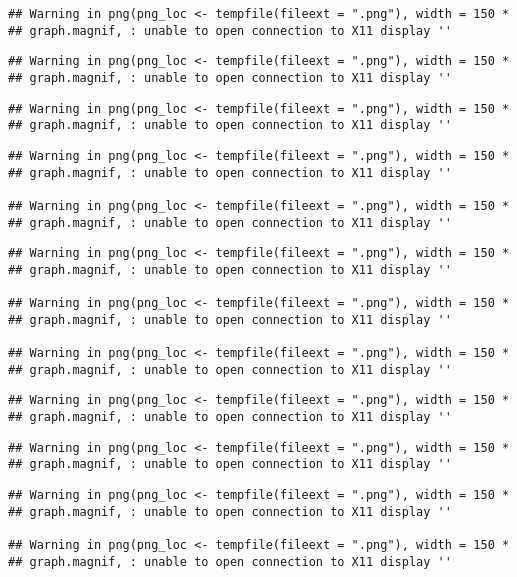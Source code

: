 \documentclass[]{article}
\begin{document}
\begin{verbatim}
## Warning in png(png_loc <- tempfile(fileext = ".png"), width = 150 *
## graph.magnif, : unable to open connection to X11 display ''
\end{verbatim}

\begin{verbatim}
## Warning in png(png_loc <- tempfile(fileext = ".png"), width = 150 *
## graph.magnif, : unable to open connection to X11 display ''
\end{verbatim}

\begin{verbatim}
## Warning in png(png_loc <- tempfile(fileext = ".png"), width = 150 *
## graph.magnif, : unable to open connection to X11 display ''
\end{verbatim}

\begin{verbatim}
## Warning in png(png_loc <- tempfile(fileext = ".png"), width = 150 *
## graph.magnif, : unable to open connection to X11 display ''

## Warning in png(png_loc <- tempfile(fileext = ".png"), width = 150 *
## graph.magnif, : unable to open connection to X11 display ''
\end{verbatim}

\begin{verbatim}
## Warning in png(png_loc <- tempfile(fileext = ".png"), width = 150 *
## graph.magnif, : unable to open connection to X11 display ''

## Warning in png(png_loc <- tempfile(fileext = ".png"), width = 150 *
## graph.magnif, : unable to open connection to X11 display ''

## Warning in png(png_loc <- tempfile(fileext = ".png"), width = 150 *
## graph.magnif, : unable to open connection to X11 display ''
\end{verbatim}

\begin{verbatim}
## Warning in png(png_loc <- tempfile(fileext = ".png"), width = 150 *
## graph.magnif, : unable to open connection to X11 display ''
\end{verbatim}

\begin{verbatim}
## Warning in png(png_loc <- tempfile(fileext = ".png"), width = 150 *
## graph.magnif, : unable to open connection to X11 display ''
\end{verbatim}

\begin{verbatim}
## Warning in png(png_loc <- tempfile(fileext = ".png"), width = 150 *
## graph.magnif, : unable to open connection to X11 display ''

## Warning in png(png_loc <- tempfile(fileext = ".png"), width = 150 *
## graph.magnif, : unable to open connection to X11 display ''
\end{verbatim}
\end{document}
